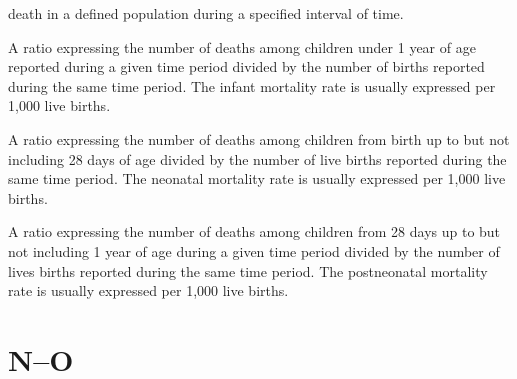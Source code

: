 \documentclass[11pt]{article}
\begin{document}
\begin{description}
death in a defined population during a specified interval of
time.
\item[Mortality rate, infant] A ratio expressing the number of
deaths among children under 1 year of age reported during a given
time period divided by the number of births reported during the
same time period. The infant mortality rate is usually expressed
per 1,000 live births.
\item[Mortality rate, neonatal] A ratio expressing the number of
deaths among children from birth up to but not including 28 days
of age divided by the number of live births reported during the
same time period. The neonatal mortality rate is usually
expressed per 1,000 live births.
\item[Mortality rate, postneonatal] A ratio expressing the number
of deaths among children from 28 days up to but not including 1
year of age during a given time period divided by the number of
lives births reported during the same time period. The
postneonatal mortality rate is usually expressed per 1,000 live
births.
\end{description}

\section*{N--O}
\end{document}

